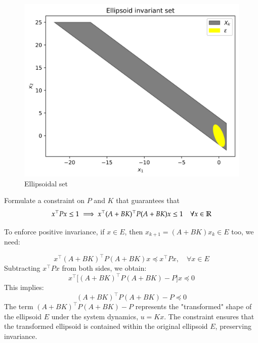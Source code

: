 \documentclass[]{article}
\begin{document}
\begin{figure}[H]
    \centering
    \begin{minipage}{0.7\textwidth}
        \centering
        \includegraphics[width=\textwidth]{images/Assignment_32.png}
        \caption{Ellipsoidal set}
        \label{fig:assignment3_2}
    \end{minipage}
\end{figure}


\begin{assignment}
	Formulate a constraint on $P$ and $K$ that guarantees that 
	\[ 
		x^\top P x \leq 1 \implies x^\top(A + BK)^\top P (A + BK)x \leq 1  \quad \forall x \in \mathbb{R}
	\]
\end{assignment}
\begin{flushleft}
	To enforce positive invariance, if $x \in E$, then $x_{k+1} = (A + BK) x_k \in E$ too, we need:
\end{flushleft}
\begin{equation}
	x^\top(A + BK)^\top P (A + BK)x \preceq x^\top P x, \quad \forall x \in E
\end{equation}
Subtracting $x^\top P x$ from both sides, we obtain:
\begin{equation}
	x^\top\Big[ (A + BK)^\top P (A + BK) - P \Big] x \preceq 0
\end{equation}
This implies:
\begin{equation}
	(A + BK)^\top P (A + BK) - P \preceq 0
\end{equation}
The term $(A + BK)^\top P (A + BK) - P$ represents the "transformed" shape of the ellipsoid $E$ under the system dynamics, $u = Kx$. The constraint ensures that the transformed ellipsoid is contained within the original ellipsoid $E$, preserving invariance.
\end{document}
